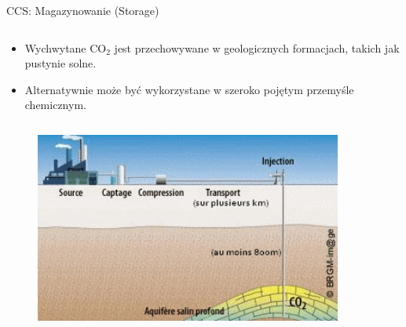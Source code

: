 \begin{columnframe}{CCS: Magazynowanie (Storage)}
    \begin{column}{0.5\textwidth}
        \begin{itemize}
            \item Wychwytane CO$_2$ jest przechowywane w geologicznych formacjach, takich jak pustynie solne.
            \item Alternatywnie może być wykorzystane w szeroko pojętym przemyśle chemicznym.
        \end{itemize}
    \end{column}
    \begin{column}{0.5\textwidth}
        \begin{figure}
            \centering
            \includegraphics[width=0.9\textwidth, frame]{images/La-chaine-de-valeur-transporter-le-CO2.jpg}
        \end{figure}
    \end{column}
\end{columnframe}


